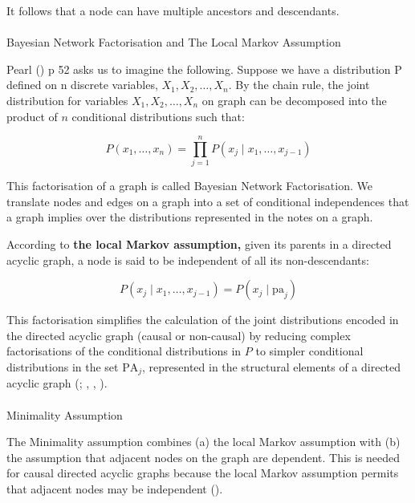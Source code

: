 \documentclass[
  single column]{article}
\makeatletter
\let\oldparagraph\paragraph
\renewcommand{\paragraph}{
    \@ifstar
      \xxxParagraphStar
      \xxxParagraphNoStar
  }
\newcommand{\xxxParagraphStar}[1]{\oldparagraph*{#1}\mbox{}}
\newcommand{\xxxParagraphNoStar}[1]{\oldparagraph{#1}\mbox{}}
\makeatother
\begin{document}
It follows that a node can have multiple ancestors and descendants.

\paragraph{Bayesian Network Factorisation and The Local Markov
Assumption}\label{bayesian-network-factorisation-and-the-local-markov-assumption}

Pearl () p 52 asks us to imagine the
following. Suppose we have a distribution P defined on n discrete
variables, \(X_1, X_2,  \dots, X_n\). By the chain rule, the joint
distribution for variables \(X_1, X_2, \dots, X_n\) on graph can be
decomposed into the product of \(n\) conditional distributions such
that:

\[
P(x_1, \dots, x_n) = \prod_{j=1}^n P(x_j \mid x_1, \dots, x_{j-1})
\]

This factorisation of a graph is called Bayesian Network Factorisation.
We translate nodes and edges on a graph into a set of conditional
independences that a graph implies over the distributions represented in
the notes on a graph.

According to \textbf{the local Markov assumption,} given its parents in
a directed acyclic graph, a node is said to be independent of all its
non-descendants:

\[
P(x_j \mid x_1, \dots, x_{j-1}) = P(x_j \mid \text{pa}_j)
\]

This factorisation simplifies the calculation of the joint distributions
encoded in the directed acyclic graph (causal or non-causal) by reducing
complex factorisations of the conditional distributions in \(P\) to
simpler conditional distributions in the set \(\text{PA}_j\),
represented in the structural elements of a directed acyclic graph
(;
, ,
).

\paragraph{Minimality Assumption}\label{minimality-assumption}

The Minimality assumption combines (a) the local Markov assumption with
(b) the assumption that adjacent nodes on the graph are dependent. This
is needed for causal directed acyclic graphs because the local Markov
assumption permits that adjacent nodes may be independent
().
\end{document}
